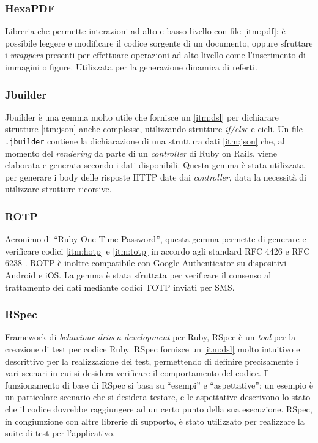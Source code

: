 \subsubsection{HexaPDF}
Libreria che permette interazioni ad alto e basso livello con file \ref{itm:pdf}: è possibile leggere e modificare il codice sorgente di un documento, oppure sfruttare i \textit{wrappers} presenti per effettuare operazioni ad alto livello come l'inserimento di immagini o figure. Utilizzata per la generazione dinamica di referti.

\subsubsection{Jbuilder}
Jbuilder è una gemma molto utile che fornisce un \ref{itm:dsl} per dichiarare strutture \ref{itm:json} anche complesse, utilizzando strutture \textit{if/else} e cicli. Un file \texttt{.jbuilder} contiene la dichiarazione di una struttura dati \ref{itm:json} che, al momento del \textit{rendering} da parte di un \textit{controller} di Ruby on Rails, viene elaborata e generata secondo i dati disponibili. Questa gemma è stata utilizzata per generare i body delle risposte HTTP date dai \textit{controller}, data la necessità di utilizzare strutture ricorsive.

\subsubsection{ROTP}
Acronimo di ``Ruby One Time Password'', questa gemma permette di generare e verificare codici \ref{itm:hotp} e \ref{itm:totp} in accordo agli standard RFC 4426 \cite{rfc4226} e RFC 6238 \cite{rfc6238}. ROTP è inoltre compatibile con Google Authenticator su dispositivi Android e iOS. La gemma è stata sfruttata per verificare il consenso al trattamento dei dati mediante codici TOTP inviati per SMS.

\subsubsection{RSpec}
Framework di \textit{behaviour-driven development} per Ruby, RSpec è un \textit{tool} per la creazione di test per codice Ruby. RSpec fornisce un \ref{itm:dsl} molto intuitivo e descrittivo per la realizzazione dei test, permettendo di definire precisamente i vari scenari in cui si desidera verificare il comportamento del codice. Il funzionamento di base di RSpec si basa su ``esempi'' e ``aspettative'': un esempio è un particolare scenario che si desidera testare, e le aspettative descrivono lo stato che il codice dovrebbe raggiungere ad un certo punto della sua esecuzione.
RSpec, in congiunzione con altre librerie di supporto, è stato utilizzato per realizzare la suite di test per l'applicativo.

